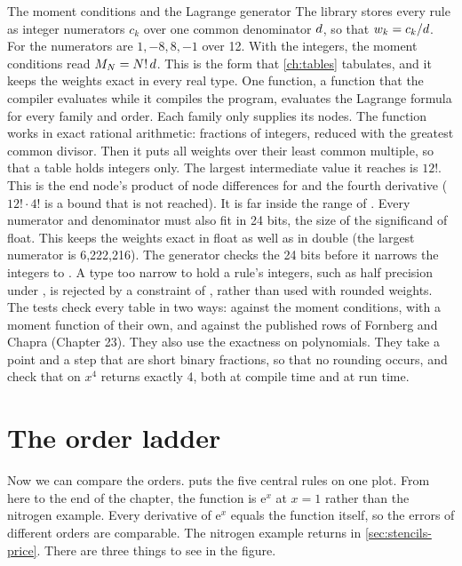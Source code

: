 \begin{sidebar}[label=sb:moments]{The moment conditions and the Lagrange generator}
The library stores every rule as integer numerators $c_k$ over one common denominator $d$, so that
$w_k = c_k / d$. For  the numerators are $1, -8, 8, -1$ over 12. With the integers, the moment
conditions read $M_{N} = N!\,d$. This is the form that \cref{ch:tables} tabulates, and it keeps the
weights exact in every real type. One  function, a function that the compiler evaluates while it
compiles the program, evaluates the Lagrange formula for every family and order. Each family only supplies its
nodes. The function works in exact rational arithmetic: fractions of  integers, reduced with the
greatest common divisor. Then it puts all weights over their least common multiple, so that a table holds integers
only. The largest intermediate value it reaches is $12!$. This is the end node's product of node differences for
 and the fourth derivative ($12! \cdot 4!$ is a bound that is not reached). It is far inside the
range of . Every numerator and denominator must also fit in 24 bits, the size of the significand of
float. This keeps the weights exact in float as well as in double (the largest numerator is 6,222,216). The
generator checks the 24 bits before it narrows the integers to . A type too narrow to hold a rule's
integers, such as half precision under , is rejected by a constraint of , rather
than used with rounded weights. The tests check every table in two ways: against the moment conditions, with a
moment function of their own, and against the published rows of Fornberg\cite{fornberg1988} and Chapra
(Chapter 23).\cite{chapra2015} They also use the exactness on polynomials. They take a point and a step that are
short binary fractions, so that no rounding occurs, and check that  on $x^4$ returns exactly 4,
both at compile time and at run time.
\end{sidebar}

\section{The order ladder}\label{sec:stencils-ladder}

Now we can compare the orders.  puts the five central rules on one plot. From here to the end
of the chapter, the function is $\mathrm{e}^x$ at $x = 1$ rather than the nitrogen example. Every derivative of
$\mathrm{e}^x$ equals the function itself, so the errors of different orders are comparable. The nitrogen example
returns in \cref{sec:stencils-price}. There are three things to see in the figure.

